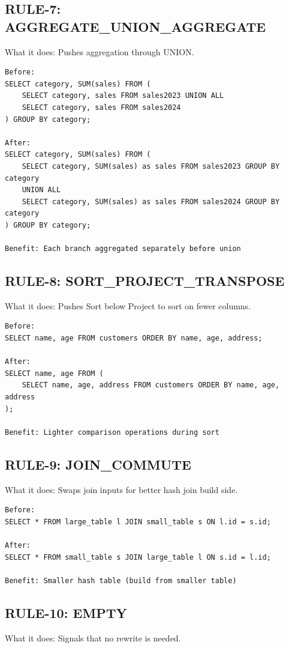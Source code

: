 \documentclass[12pt,a4paper]{article}
\begin{document}
\subsection{RULE-7: AGGREGATE\_UNION\_AGGREGATE}
What it does: Pushes aggregation through UNION.

\begin{verbatim}
Before:
SELECT category, SUM(sales) FROM (
    SELECT category, sales FROM sales2023 UNION ALL
    SELECT category, sales FROM sales2024
) GROUP BY category;

After:
SELECT category, SUM(sales) FROM (
    SELECT category, SUM(sales) as sales FROM sales2023 GROUP BY category
    UNION ALL
    SELECT category, SUM(sales) as sales FROM sales2024 GROUP BY category
) GROUP BY category;

Benefit: Each branch aggregated separately before union
\end{verbatim}

\subsection{RULE-8: SORT\_PROJECT\_TRANSPOSE}
What it does: Pushes Sort below Project to sort on fewer columns.

\begin{verbatim}
Before:
SELECT name, age FROM customers ORDER BY name, age, address;

After:
SELECT name, age FROM (
    SELECT name, age, address FROM customers ORDER BY name, age, address
);

Benefit: Lighter comparison operations during sort
\end{verbatim}

\subsection{RULE-9: JOIN\_COMMUTE}
What it does: Swaps join inputs for better hash join build side.

\begin{verbatim}
Before:
SELECT * FROM large_table l JOIN small_table s ON l.id = s.id;

After:
SELECT * FROM small_table s JOIN large_table l ON s.id = l.id;

Benefit: Smaller hash table (build from smaller table)
\end{verbatim}

\subsection{RULE-10: EMPTY}
What it does: Signals that no rewrite is needed.
\end{document}

